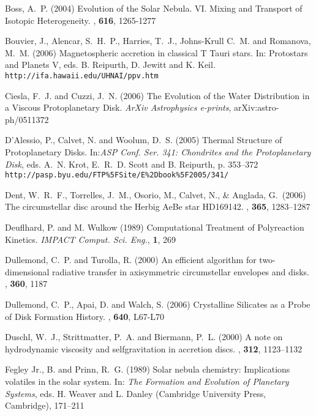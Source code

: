 \begin{literature}
\item
Boss, A.~P. (2004) Evolution of the Solar Nebula. VI. Mixing and Transport of
Isotopic Heterogeneity. \apj, \textbf{616}, 1265-1277

\item
Bouvier, J., Alencar, S.~H.~P., Harries, T.~J., Johns-Krull C.~M. and Romanova, M.~M. (2006) Magnetospheric accretion in classical T Tauri stars.  In:
Protostars and Planets V, eds. B. Reipurth, D. Jewitt and K. Keil.\\ 
  {\tt http://ifa.hawaii.edu/UHNAI/ppv.htm}

\item
Ciesla, F.~J. and Cuzzi, J.~N. (2006) The Evolution of the Water Distribution in
a Viscous Protoplanetary Disk. \textit{ArXiv Astrophysics e-prints},
arXiv:astro-ph/0511372

\item
D'Alessio, P., Calvet, N. and Woolum, D.~S. (2005) Thermal Structure of
Protoplanetary Disks. In:\textit{ASP Conf. Ser. 341: Chondrites and the
Protoplanetary Disk}, eds. A.~N. Krot,  E.~R.~D. Scott and B. Reipurth, p.
353--372
{\tt http://pasp.byu.edu/FTP\%5FSite/E\%2Dbook\%5F2005/341/}

\item
Dent, W.~R.~F., Torrelles, J.~M., Osorio, M., Calvet, N., \& Anglada, G.\ (2006)
The circumstellar disc around the Herbig AeBe star HD169142.
\mnras, \textbf{365}, 1283--1287

\item
Deuflhard, P. and M. Wulkow (1989) Computational Treatment of Polyreaction
Kinetics. \textit{IMPACT Comput. Sci. Eng.}, \textbf{1}, 269

\item
{Dullemond}, C.\ P. and {Turolla}, R. (2000) An efficient algorithm for 
two-dimensional radiative transfer in axisymmetric circumstellar 
envelopes and disks. \aap, \textbf{360}, 1187

\item
Dullemond, C.~P., Apai, D. and {Walch}, S. (2006) Crystalline Silicates as a
Probe of Disk Formation History. \apjl, \textbf{640}, L67-L70

\item
Duschl, W.~J., Strittmatter, P.~A. and Biermann, P.~L. (2000) A note on
hydrodynamic viscosity and selfgravitation in accretion discs. \aap,
\textbf{312}, 1123--1132

\item
Fegley Jr., B. and Prinn, R.~G. (1989) Solar nebula chemistry:
Implications volatiles in the solar system. In: \textit{The Formation and Evolution of Planetary Systems}, eds. H. Weaver and L. Danley (Cambridge University
Press, Cambridge), 171--211


\end{literature}
